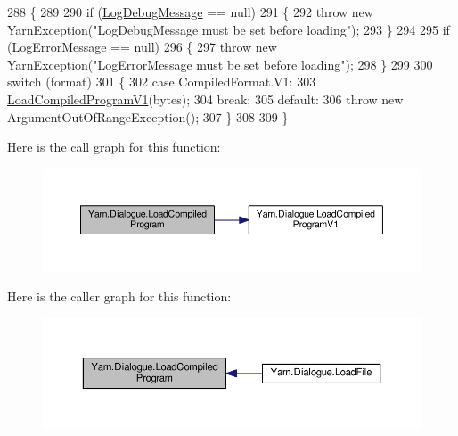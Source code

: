 \begin{DoxyCode}
288         \{
289 
290             \textcolor{keywordflow}{if} (\hyperlink{a00086_a381f48bb0fbb294f8cf44ca57f11be31}{LogDebugMessage} == null)
291             \{
292                 \textcolor{keywordflow}{throw} \textcolor{keyword}{new} YarnException(\textcolor{stringliteral}{"LogDebugMessage must be set before loading"});
293             \}
294 
295             \textcolor{keywordflow}{if} (\hyperlink{a00086_a9801e83dd044d6498fdf6ebcc6bec5ac}{LogErrorMessage} == null)
296             \{
297                 \textcolor{keywordflow}{throw} \textcolor{keyword}{new} YarnException(\textcolor{stringliteral}{"LogErrorMessage must be set before loading"});
298             \}
299 
300             \textcolor{keywordflow}{switch} (format)
301             \{
302                 \textcolor{keywordflow}{case} CompiledFormat.V1:
303                     \hyperlink{a00086_a706df08e842c2419f7a66fd40c0a544f}{LoadCompiledProgramV1}(bytes);
304                     \textcolor{keywordflow}{break};
305                 \textcolor{keywordflow}{default}:
306                     \textcolor{keywordflow}{throw} \textcolor{keyword}{new} ArgumentOutOfRangeException();
307             \}
308 
309         \}
\end{DoxyCode}


Here is the call graph for this function\-:
\nopagebreak
\begin{figure}[H]
\begin{center}
\leavevmode
\includegraphics[width=350pt]{a00086_a4bc1ceca26754dc3ec0a2281dfee26ce_cgraph}
\end{center}
\end{figure}




Here is the caller graph for this function\-:
\nopagebreak
\begin{figure}[H]
\begin{center}
\leavevmode
\includegraphics[width=350pt]{a00086_a4bc1ceca26754dc3ec0a2281dfee26ce_icgraph}
\end{center}
\end{figure}


